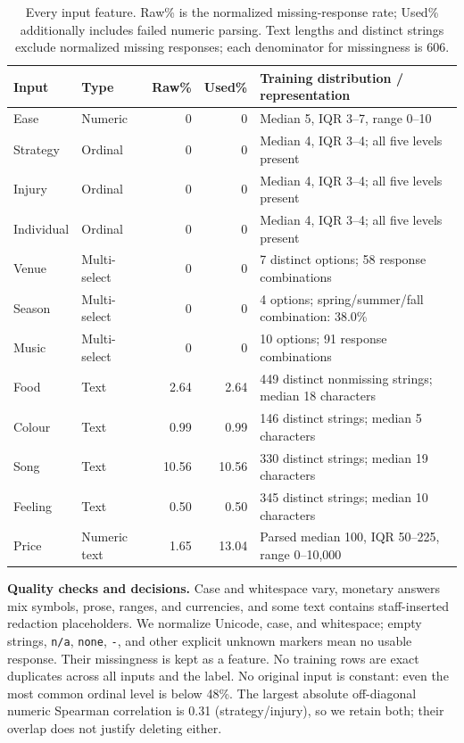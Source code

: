 \documentclass[12pt]{article}
\begin{document}
\begin{table}[h!]
\centering\small
\setlength{\tabcolsep}{4pt}
\begin{tabular}{@{}p{.74in}p{.68in}rrp{3.15in}@{}}
\toprule
Input & Type & Raw\% & Used\% & Training distribution / representation\\
\midrule
Ease & Numeric & 0 & 0 & Median 5, IQR 3--7, range 0--10\\
Strategy & Ordinal & 0 & 0 & Median 4, IQR 3--4; all five levels present\\
Injury & Ordinal & 0 & 0 & Median 4, IQR 3--4; all five levels present\\
Individual & Ordinal & 0 & 0 & Median 4, IQR 3--4; all five levels present\\
Venue & Multi-select & 0 & 0 & 7 distinct options; 58 response combinations\\
Season & Multi-select & 0 & 0 & 4 options; spring/summer/fall combination: 38.0\%\\
Music & Multi-select & 0 & 0 & 10 options; 91 response combinations\\
Food & Text & 2.64 & 2.64 & 449 distinct nonmissing strings; median 18 characters\\
Colour & Text & 0.99 & 0.99 & 146 distinct strings; median 5 characters\\
Song & Text & 10.56 & 10.56 & 330 distinct strings; median 19 characters\\
Feeling & Text & 0.50 & 0.50 & 345 distinct strings; median 10 characters\\
Price & Numeric text & 1.65 & 13.04 & Parsed median 100, IQR 50--225, range 0--10,000\\
\bottomrule
\end{tabular}
\caption{Every input feature. Raw\% is the normalized missing-response rate;
Used\% additionally includes failed numeric parsing. Text lengths and distinct
strings exclude normalized missing responses; each denominator for missingness is 606.}
\end{table}

\textbf{Quality checks and decisions.}
Case and whitespace vary, monetary answers mix symbols, prose, ranges, and currencies,
and some text contains staff-inserted redaction placeholders. We normalize Unicode,
case, and whitespace; empty strings, \texttt{n/a}, \texttt{none}, \texttt{-}, and
other explicit unknown markers mean no usable response. Their missingness is kept
as a feature. No training rows are exact duplicates across all inputs and the label.
No original input is constant: even the most common ordinal level is below 48\%.
The largest absolute off-diagonal numeric Spearman correlation is 0.31
(strategy/injury), so we retain both; their overlap does not justify deleting either.
\end{document}
